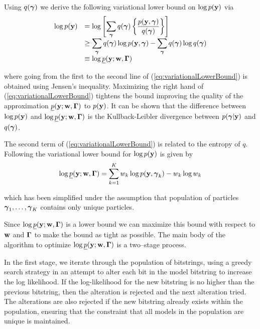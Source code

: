 Using $q({\boldsymbol \gamma})$ we derive the following variational lower bound on $\log
p({\bf y})$ via
\begin{equation}
\label{eq:variationalLowerBound}
\begin{array}{rl}
\displaystyle \log p({\bf y}) 
& \displaystyle = \log \left[ \sum_{{\boldsymbol \gamma}} q({\boldsymbol \gamma}) \left\{  \frac{p({\bf y},{\boldsymbol \gamma})}{q({\boldsymbol \gamma}) } \right\} \right]
\\
& \displaystyle \ge \sum_{{\boldsymbol \gamma}} q({\boldsymbol \gamma}) \log p({\bf y},{\boldsymbol \gamma}) 
- \sum_{{\boldsymbol \gamma}} q({\boldsymbol \gamma}) \log q({\boldsymbol \gamma})
\\
& \displaystyle \equiv \log \underline{p}({\bf y};{\bf w},{\boldsymbol \Gamma})
\end{array}
\end{equation}

\noindent where going from the first to the second line of
(\ref{eq:variationalLowerBound}) is obtained using Jensen's inequality.
Maximizing the right hand  of (\ref{eq:variationalLowerBound}) tightens the
bound improving the quality of the approximation
$\underline{p}({\bf y};{\bf w},{\boldsymbol \Gamma})$ to $p({\bf y})$. It can be shown that the
difference between $\log p({\bf y})$ and $\log \underline{p}({\bf y};{\bf w},{\boldsymbol \Gamma})$ is
the Kullback-Leibler divergence between $p({\boldsymbol \gamma}|{\bf y})$ and $q({\boldsymbol \gamma})$.

The second term of (\ref{eq:variationalLowerBound}) is related to the entropy
of $q$. Following \cite{Rockova2017} the variational lower bound for $\log
p({\bf y})$ is given by
\begin{equation}\label{eq:objective}
\displaystyle \log \underline{p}({\bf y};{\bf w},{\boldsymbol \Gamma}) 
= \sum_{k=1}^K w_k\log p({\bf y},{\boldsymbol \gamma}_k) - w_k \log w_k
\end{equation}

\noindent which has been simplified under the assumption that population of
particles ${\boldsymbol \gamma}_1,\ldots,{\boldsymbol \gamma}_K$ contains only unique particles.

Since $\log \underline{p}({\bf y};{\bf w},{\boldsymbol \Gamma})$ is a lower bound we can maximize
this bound with respect to ${\bf w}$ and ${\boldsymbol \Gamma}$ to make the bound as tight as
possible.  The main body of the algorithm to optimize $\log
\underline{p}({\bf y};{\bf w},{\boldsymbol \Gamma})$ is a two--stage process. 

In the first stage, we iterate through the population of bitstrings, using a
greedy search strategy in an attempt to alter each bit in the model bitstring
to increase the log likelihood. If the log-likelihood for the new bitstring is
no higher than the previous bitstring, then the alteration is rejected and the
next alteration tried. The alterations are also rejected if the new bitstring
already exists within the population, ensuring that the constraint that all
models in the population are unique is maintained.

